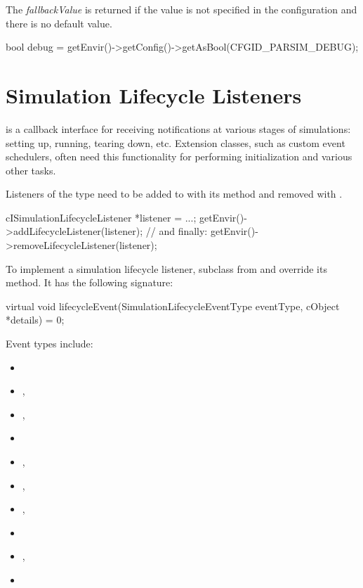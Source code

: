 The \textit{fallbackValue} is returned if the value is not specified in the configuration
and there is no default value.

\begin{cpp}
bool debug = getEnvir()->getConfig()->getAsBool(CFGID_PARSIM_DEBUG);
\end{cpp}


\section{Simulation Lifecycle Listeners}
\label{sec:plugin-exts:simulation-lifetime-listeners}

 is a callback interface for receiving
notifications at various stages of simulations: setting up, running, tearing
down, etc. Extension classes, such as custom event schedulers, often need this
functionality for performing initialization and various other tasks.

Listeners of the type  need to be added to
 with its  method and removed with
.

\begin{cpp}
cISimulationLifecycleListener *listener = ...;
getEnvir()->addLifecycleListener(listener);
// and finally:
getEnvir()->removeLifecycleListener(listener);
\end{cpp}

To implement a simulation lifecycle listener, subclass from
 and override its 
method. It has the following signature:

\begin{cpp}
virtual void lifecycleEvent(SimulationLifecycleEventType eventType, cObject *details) = 0;
\end{cpp}


Event types include:

\begin{itemize}[noitemsep]
  \item {}
  \item {}, 
  \item {}, 
  \item {}
  \item {}, 
  \item {}, 
  \item {}, 
  \item {}
  \item {}, 
  \item {}
\end{itemize}

